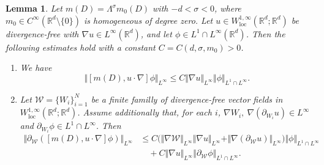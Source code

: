 \documentclass[reqno,11pt,a4paper]{amsart}
\newtheorem{lemma}[theorem]{Lemma}
\newcommand{\R}{\ensuremath{\mathbb{R}}}
\newcommand{\WW}{\ensuremath{\mathcal{W}}}
\begin{document}
\begin{lemma}\label{lem:pW}
Let $m(D)=\Lambda^\sigma m_0(D)$ with $-d<\sigma<0$,
where $m_0\in C^\infty(\R^d\setminus\{0\})$
is homogeneous of degree zero.
Let $u\in W^{1,\infty}_{\mathrm{loc}}(\R^d;\R^d)$
be divergence-free with $\nabla u\in L^\infty(\R^d)$,
and let $\phi\in L^1\cap L^\infty(\R^d)$.
Then the following estimates hold
with a constant $C=C(d,\sigma,m_0)>0$.
\begin{enumerate}[(1)]
\item
We have
\begin{equation}\label{es:prod-es5}
  \Vert [m(D),u\cdot\nabla]\phi\Vert _{L^\infty}
  \leq C\Vert \nabla u\Vert _{L^\infty}
  \Vert \phi\Vert _{L^1\cap L^\infty}.
\end{equation}

\item
Let $\WW=\{W_i\}_{i=1}^N$ be a finite familly
of divergence-free vector fields
in $W^{1,\infty}_{\mathrm{loc}}(\R^d;\R^d)$.
Assume additionally that, for each $i$,
$\nabla W_i,\ \nabla(\partial_{W_i}u)\in L^\infty$
and $\partial_{W_i}\phi\in L^1\cap L^\infty$.
Then
\begin{equation}\label{es:prod-es4}
\begin{aligned}
  \Vert \partial_{\WW}([m(D),u\cdot\nabla]\phi)\Vert _{L^\infty}
  &\leq
  C\bigl(
    \Vert \nabla\WW\Vert _{L^\infty}\Vert \nabla u\Vert _{L^\infty}
    +\Vert \nabla(\partial_{\WW}u)\Vert _{L^\infty}
  \bigr)\Vert \phi\Vert _{L^1\cap L^\infty}
  \\
  &\quad+
  C\Vert \nabla u\Vert _{L^\infty}
  \Vert \partial_{\WW}\phi\Vert _{L^1\cap L^\infty}.
\end{aligned}
\end{equation}
\end{enumerate}
\end{lemma}
\end{document}
